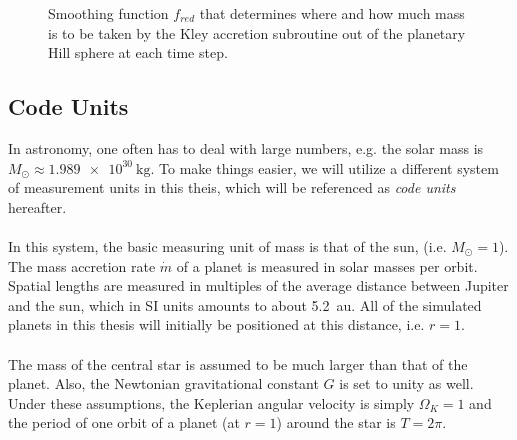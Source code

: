         \begin{figure}[h!]
          \centering
          \begin{minipage}{.5\linewidth}
            \centering
          \end{minipage}%
          \begin{minipage}{.5\linewidth}
            \centering
          \end{minipage}
          \caption{Smoothing function $f_{red}$ that determines where and how 
            much mass is to be taken by the Kley accretion subroutine out of the 
            planetary Hill sphere at each time step.
          }
          \label{fig:f_red_in_the_hill_sphere}
        \end{figure}
        
        \clearpage
        \subsection{Code Units}
          In astronomy, one often has to deal with large numbers, e.g. the 
          solar mass is $M_\odot\approx\SI{1.989e30}{\kilo\gram}$. 
          To make things easier, we will utilize a different system
          of measurement units in this theis, which will be
          referenced as \textit{code units} hereafter. \\
          \\
          In this system, the basic measuring unit of mass is that of the sun,
          (i.e. $M_\odot=1$). 
          The mass accretion rate $\dot{m}$ of a planet is measured in solar 
          masses per orbit.
          Spatial lengths are measured in multiples of the 
          average distance between Jupiter and the sun, which in SI units 
          amounts to 
          about \SI{5.2}{\astronomicalunit}. All of the simulated planets in 
          this thesis will initially be positioned at this distance, i.e. 
          $r=1$. \\
          \\
          The mass of the central star is assumed to be much larger than that 
          of the planet. Also, the Newtonian gravitational constant $G$ 
          is set to unity as well. Under these assumptions, the Keplerian 
          angular 
          velocity is simply $\Omega_K=1$ and the period of one orbit of a 
          planet 
          (at $r=1$) around the star is $T=2\pi$. \\
          \\
        \\
